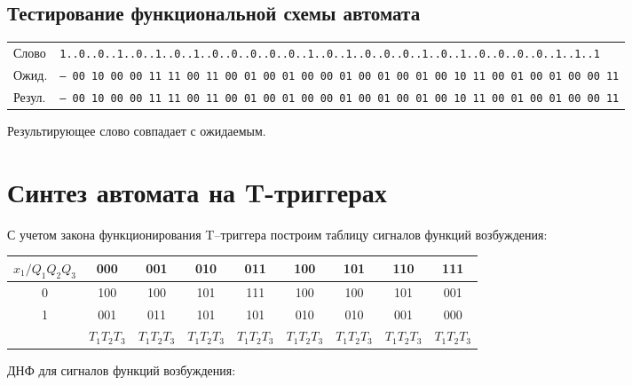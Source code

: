 \documentclass[12pt, a4paper]{article}
\begin{document}
\subsection*{Тестирование функциональной схемы автомата}

\begin{center}
  \begin{tabular}{| l  l |}
    \hline
    Слово & \footnotesize{\texttt{1..0..0..1..0..1..0..1..0..0..0..0..0..1..0..1..0..0..0..1..0..1..0..0..0..0..1..1..1}}\\
    Ожид. & \footnotesize{\texttt{-- 00 10 00 00 11 11 00 11 00 01 00 01 00 00 01 00 01 00 01 00 10 11 00 01 00 01 00 00 11}}\\
    Резул. & \footnotesize{\texttt{-- 00 10 00 00 11 11 00 11 00 01 00 01 00 00 01 00 01 00 01 00 10 11 00 01 00 01 00 00 11}}\\\hline
  \end{tabular}
\end{center}

Результирующее слово совпадает с ожидаемым.

\section*{Синтез автомата на T-триггерах}

С учетом закона функционирования T–триггера построим таблицу сигналов функций возбуждения:

\begin{tabular}{|*{9}{c|}}
  \hline
  $x_1/Q_1Q_2Q_3$ & 000 & 001 & 010 & 011 & 100 & 101 & 110 & 111\\\hline
  0 & 100 & 100 & 101 & 111 & 100 & 100 & 101 & 001\\\hline
  1 & 001 & 011 & 101 & 101 & 010 & 010 & 001 & 000\\\hline
   & $T_1T_2T_3$ & $T_1T_2T_3$ & $T_1T_2T_3$ & $T_1T_2T_3$ & $T_1T_2T_3$ & $T_1T_2T_3$ & $T_1T_2T_3$ & $T_1T_2T_3$\\\hline
\end{tabular}

ДНФ для сигналов функций возбуждения:
\end{document}
